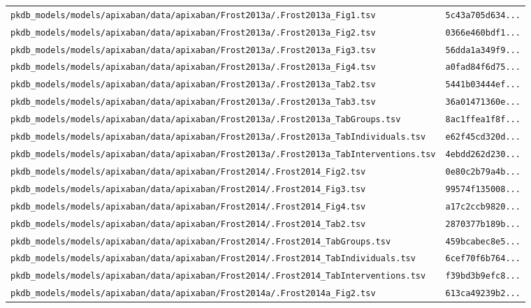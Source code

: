 \documentclass{article}
\begin{document}
\begin{longtable}{ll}
\texttt{pkdb\_models/models/apixaban/data/apixaban/Frost2013a/.Frost2013a\_Fig1.tsv} & \texttt{5c43a705d634...} \\
\texttt{pkdb\_models/models/apixaban/data/apixaban/Frost2013a/.Frost2013a\_Fig2.tsv} & \texttt{0366e460bdf1...} \\
\texttt{pkdb\_models/models/apixaban/data/apixaban/Frost2013a/.Frost2013a\_Fig3.tsv} & \texttt{56dda1a349f9...} \\
\texttt{pkdb\_models/models/apixaban/data/apixaban/Frost2013a/.Frost2013a\_Fig4.tsv} & \texttt{a0fad84f6d75...} \\
\texttt{pkdb\_models/models/apixaban/data/apixaban/Frost2013a/.Frost2013a\_Tab2.tsv} & \texttt{5441b03444ef...} \\
\texttt{pkdb\_models/models/apixaban/data/apixaban/Frost2013a/.Frost2013a\_Tab3.tsv} & \texttt{36a01471360e...} \\
\texttt{pkdb\_models/models/apixaban/data/apixaban/Frost2013a/.Frost2013a\_TabGroups.tsv} & \texttt{8ac1ffea1f8f...} \\
\texttt{pkdb\_models/models/apixaban/data/apixaban/Frost2013a/.Frost2013a\_TabIndividuals.tsv} & \texttt{e62f45cd320d...} \\
\texttt{pkdb\_models/models/apixaban/data/apixaban/Frost2013a/.Frost2013a\_TabInterventions.tsv} & \texttt{4ebdd262d230...} \\
\texttt{pkdb\_models/models/apixaban/data/apixaban/Frost2014/.Frost2014\_Fig2.tsv} & \texttt{0e80c2b79a4b...} \\
\texttt{pkdb\_models/models/apixaban/data/apixaban/Frost2014/.Frost2014\_Fig3.tsv} & \texttt{99574f135008...} \\
\texttt{pkdb\_models/models/apixaban/data/apixaban/Frost2014/.Frost2014\_Fig4.tsv} & \texttt{a17c2ccb9820...} \\
\texttt{pkdb\_models/models/apixaban/data/apixaban/Frost2014/.Frost2014\_Tab2.tsv} & \texttt{2870377b189b...} \\
\texttt{pkdb\_models/models/apixaban/data/apixaban/Frost2014/.Frost2014\_TabGroups.tsv} & \texttt{459bcabec8e5...} \\
\texttt{pkdb\_models/models/apixaban/data/apixaban/Frost2014/.Frost2014\_TabIndividuals.tsv} & \texttt{6cef70f6b764...} \\
\texttt{pkdb\_models/models/apixaban/data/apixaban/Frost2014/.Frost2014\_TabInterventions.tsv} & \texttt{f39bd3b9efc8...} \\
\texttt{pkdb\_models/models/apixaban/data/apixaban/Frost2014a/.Frost2014a\_Fig2.tsv} & \texttt{613ca49239b2...} \\

\end{longtable}
\end{document}

